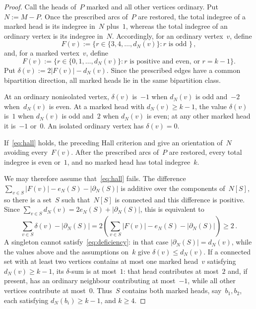 \documentclass[12pt,reqno,a4paper]{amsart}
\begin{document}
\begin{proof}
  Call the heads of~$P$ marked and all other vertices ordinary.
  Put $N := M-P$.
  Once the prescribed arcs of~$P$ are restored, the total indegree of a marked
  head is its indegree in~$N$ plus~$1$, whereas the total indegree of an
  ordinary vertex is its indegree in~$N$.
  Accordingly, for an ordinary vertex~$v$, define
  \[
    F(v) := \{r \in \{3,4,\ldots,d_N(v)\} \colon r \text{ is odd }\} \, ,
  \]
  and, for a marked vertex~$v$, define
  \[
    F(v) := \{r \in \{0,1,\ldots,d_N(v)\} \colon r \text{ is positive and even,
    or } r = k-1\}.
  \]
  Put $\delta(v) := 2|F(v)| - d_N(v)$.
  Since the prescribed edges have a common bipartition direction, all marked
  heads lie in the same bipartition class.

  At an ordinary nonisolated vertex, $\delta(v)$ is~$-1$ when $d_N(v)$ is odd
  and~$-2$ when~$d_N(v)$ is even.
  At a marked head with $d_N(v) \ge k-1$, the value $\delta(v)$ is~$1$ when
  $d_N(v)$ is odd and~$2$ when $d_N(v)$ is even; at any other marked head it
  is~$-1$ or~$0$.
  An isolated ordinary vertex has $\delta(v) = 0$.

  If~\eqref{eq:hall} holds, the preceding Hall criterion and 
  give an orientation of~$N$ avoiding every~$F(v)$.
  After the prescribed arcs of~$P$ are restored, every total indegree is even
  or~$1$, and no marked head has total indegree~$k$.

  We may therefore assume that~\eqref{eq:hall} fails.
  The difference $\sum_{v \in S} |F(v)| - e_N(S) - |\partial_N(S)|$ is additive
  over the components of~$N[S]$, so there is a set~$S$ such that~$N[S]$ is
  connected and this difference is positive. 
  Since $\sum_{v \in S} d_N(v) = 2e_N(S) + |\partial_N(S)|$, this is equivalent
  to
  \begin{equation}\label{eq:deficiency}
    \sum_{v \in S} \delta(v) - |\partial_N(S)|
      = 2 \left(\sum_{v \in S} |F(v)| - e_N(S) - |\partial_N(S)| \right) \ge 2 \, .
  \end{equation}
  A singleton cannot satisfy~\eqref{eq:deficiency}: in that case
  $|\partial_N(S)| = d_N(v)$, while the values above and the assumptions on~$k$
  give $\delta(v) \le d_N(v)$. 
  If a connected set with at least two vertices contains at most one marked
  head~$v$ satisfying $d_N(v) \ge k-1$, its $\delta$-sum is at most~$1$: that
  head contributes at most~$2$ and, if present, has an ordinary neighbour
  contributing at most~$-1$, while all other vertices contribute at most~$0$.
  Thus~$S$ contains both marked heads, say~$b_1,b_2$, each satisfying
  $d_N(b_i) \ge k-1$, and $k \ge 4$.


\end{proof}
\end{document}
